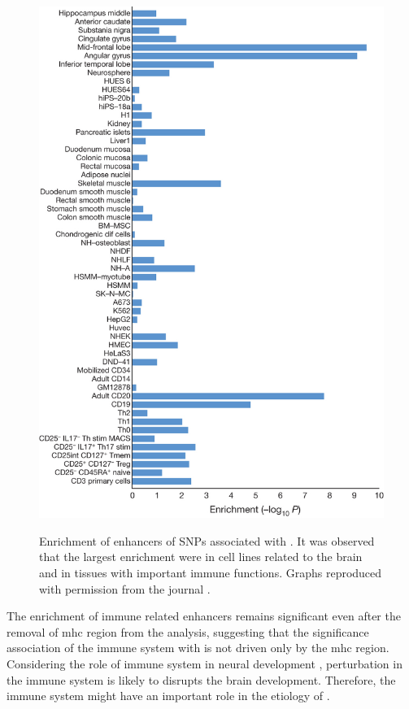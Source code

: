 	\begin{figure}
		\centering
		\caption[Enrichment of enhancers of SNPs associated with Schizophrenia]{Enrichment of enhancers of SNPs associated with . 
			It was observed that the largest enrichment were in cell lines related to the brain and in tissues with important immune functions. 
			Graphs reproduced with permission from the journal \citep{Ripke2014}.}
		\includegraphics[height=\textwidth]{figure/pgc_enrichment_tissue.jpg}
		\label{fig:pgcEnrich}
	\end{figure}
	
	The enrichment of immune related enhancers remains significant even after the removal of \gls{mhc} region from the analysis, suggesting that the significance association of the immune system with  is not driven only by the \gls{mhc} region.
	Considering the role of immune system in neural development \citep{Zhao1998,Deverman2009}, perturbation in the immune system is likely to disrupts the brain development.
	Therefore, the immune system might have an important role in the etiology of .
%	
	

